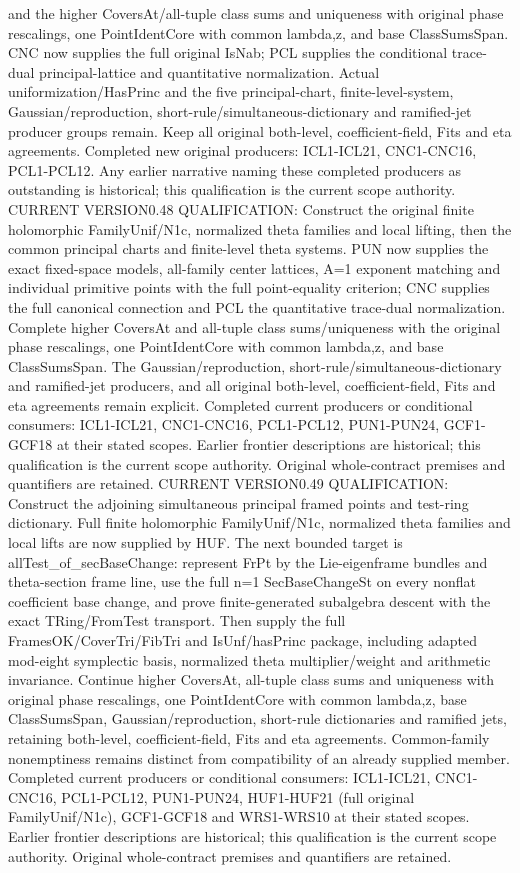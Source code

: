 and the higher CoversAt/all-tuple class sums and uniqueness with original phase rescalings, one PointIdentCore with common lambda,z, and base ClassSumsSpan. CNC now supplies the full original IsNab; PCL supplies the conditional trace-dual principal-lattice and quantitative normalization. Actual uniformization/HasPrinc and the five principal-chart, finite-level-system, Gaussian/reproduction, short-rule/simultaneous-dictionary and ramified-jet producer groups remain. Keep all original both-level, coefficient-field, Fits and eta agreements. Completed new original producers: ICL1-ICL21, CNC1-CNC16, PCL1-PCL12. Any earlier narrative naming these completed producers as outstanding is historical; this qualification is the current scope authority. CURRENT VERSION0.48 QUALIFICATION: Construct the original finite holomorphic FamilyUnif/N1c, normalized theta families and local lifting, then the common principal charts and finite-level theta systems. PUN now supplies the exact fixed-space models, all-family center lattices, A=1 exponent matching and individual primitive points with the full point-equality criterion; CNC supplies the full canonical connection and PCL the quantitative trace-dual normalization. Complete higher CoversAt and all-tuple class sums/uniqueness with the original phase rescalings, one PointIdentCore with common lambda,z, and base ClassSumsSpan. The Gaussian/reproduction, short-rule/simultaneous-dictionary and ramified-jet producers, and all original both-level, coefficient-field, Fits and eta agreements remain explicit. Completed current producers or conditional consumers: ICL1-ICL21, CNC1-CNC16, PCL1-PCL12, PUN1-PUN24, GCF1-GCF18 at their stated scopes. Earlier frontier descriptions are historical; this qualification is the current scope authority. Original whole-contract premises and quantifiers are retained. CURRENT VERSION0.49 QUALIFICATION: Construct the adjoining simultaneous principal framed points and test-ring dictionary. Full finite holomorphic FamilyUnif/N1c, normalized theta families and local lifts are now supplied by HUF. The next bounded target is allTest\_\allowbreak of\_\allowbreak secBaseChange: represent FrPt by the Lie-eigenframe bundles and theta-section frame line, use the full n=1 SecBaseChangeSt on every nonflat coefficient base change, and prove finite-generated subalgebra descent with the exact TRing/FromTest transport. Then supply the full FramesOK/CoverTri/FibTri and IsUnf/hasPrinc package, including adapted mod-eight symplectic basis, normalized theta multiplier/weight and arithmetic invariance. Continue higher CoversAt, all-tuple class sums and uniqueness with original phase rescalings, one PointIdentCore with common lambda,z, base ClassSumsSpan, Gaussian/reproduction, short-rule dictionaries and ramified jets, retaining both-level, coefficient-field, Fits and eta agreements. Common-family nonemptiness remains distinct from compatibility of an already supplied member. Completed current producers or conditional consumers: ICL1-ICL21, CNC1-CNC16, PCL1-PCL12, PUN1-PUN24, HUF1-HUF21 (full original FamilyUnif/N1c), GCF1-GCF18 and WRS1-WRS10 at their stated scopes. Earlier frontier descriptions are historical; this qualification is the current scope authority. Original whole-contract premises and quantifiers are retained.

